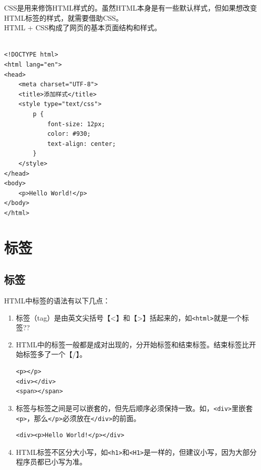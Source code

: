 CSS是用来修饰HTML样式的。虽然HTML本身是有一些默认样式，但如果想改变HTML标签的样式，就需要借助CSS。 \\

HTML + CSS构成了网页的基本页面结构和样式。 \\

 \\
\begin{lstlisting}[style=htmlcssjs]
<!DOCTYPE html>
<html lang="en">
<head>
    <meta charset="UTF-8">
    <title>添加样式</title>
    <style type="text/css">
        p {
            font-size: 12px;
            color: #930;
            text-align: center;
        }
    </style>
</head>
<body>
    <p>Hello World!</p>
</body>
</html>
\end{lstlisting}

\newpage

\section{标签}

\subsection{标签}

HTML中标签的语法有以下几点：

\begin{enumerate}
    \item 标签（tag）是由英文尖括号【<】和【>】括起来的，如\lstinline|<html>|就是一个标签??

    \item HTML中的标签一般都是成对出现的，分开始标签和结束标签。结束标签比开始标签多了一个【/】。 \\
          \begin{lstlisting}[style=htmlcssjs]
<p></p>
<div></div>
<span></span>
    \end{lstlisting}

    \item 标签与标签之间是可以嵌套的，但先后顺序必须保持一致。如，\lstinline|<div>|里嵌套\lstinline|<p>|，那么\lstinline|</p>|必须放在\lstinline|</div>|的前面。 \\
          \begin{lstlisting}[style=htmlcssjs]
<div><p>Hello World!</p></div>
    \end{lstlisting}

    \item HTML标签不区分大小写，如\lstinline|<h1>|和\lstinline|<H1>|是一样的，但建议小写，因为大部分程序员都已小写为准。
\end{enumerate}

